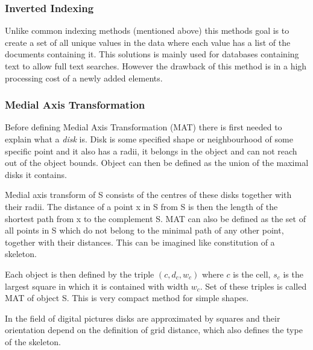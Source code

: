 \subsubsection{Inverted Indexing}
Unlike common indexing methods (mentioned above) this methods goal is to create a set of all unique values in the data where each value has a list of the documents containing it. This solutions is mainly used for databases containing text to allow full text searches. However the drawback of this method is in a high processing cost of a newly added elements. \cite{invertIndex}

\subsubsection{Medial Axis Transformation}
Before defining Medial Axis Transformation (MAT) there is first needed to explain what a \textit{disk} is.
Disk is some specified shape or neighbourhood of some specific point and it also has a radii, it belongs in the object and can not reach out of the object bounds. Object can then be defined as the union of the maximal disks it contains.

Medial axis transform of S consists of the centres of these disks together with their radii. The distance of a point x in S from S is then the length of the shortest path from x to the complement S. MAT can also be defined as the set of all points in S which do not belong to the minimal path of any other point, together with their distances. This can be imagined like constitution of a skeleton.

Each object is then defined by the triple $(c, d_c, w_c)$ where $c$ is the cell, $s_c$ is the largest square in which it is contained with width $w_c$. Set of these triples is called MAT of object S. This is very compact method for simple shapes.

In the field of digital pictures disks are approximated by squares and their orientation depend on the definition of grid distance, which also defines the type of the skeleton.

